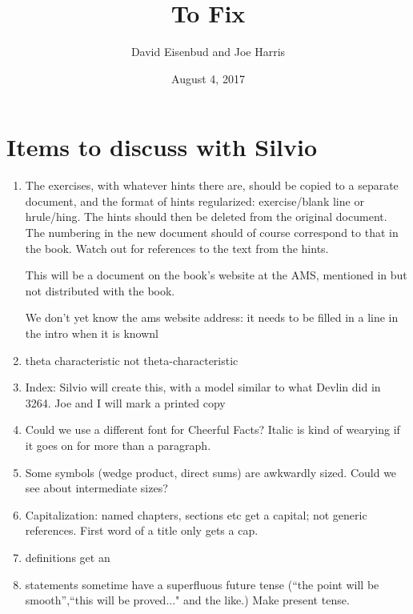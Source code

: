 \documentclass[12pt, leqno]{book}
\date{August 4, 2017}
\title{To Fix}
\author{David Eisenbud and Joe Harris }
\begin{document}
\maketitle

\setlength{\parskip}{5pt}

 
 \section{Items to discuss with Silvio}
 
 \begin{enumerate}
 
 \item The exercises, with whatever hints there are, should be copied to a separate document, and the format of hints regularized: 
 exercise/blank line or hrule/hing. The hints should then be deleted from the original document. The numbering in the new document should of course correspond to that in the book. Watch out for references to the text from the hints.
 
 This will be a document on the book's website at the AMS, 
 mentioned in but not distributed with the book.
 
 We don't yet know the ams website address: it needs to be filled in a line in the intro when it is knownl
   
\item theta characteristic not theta-characteristic 

 \item Index: Silvio will create this, with a model similar to what Devlin did in 3264. Joe and I will mark a printed copy
 
 \item Could we use a different font for Cheerful Facts? Italic is kind of wearying if it goes on for more than a paragraph.
 
 \item Some symbols (wedge product, direct sums) are awkwardly sized. Could we see about intermediate sizes?
 
 \item Capitalization: named chapters, sections etc get a capital; not generic references. First word of a title only gets a cap.
 
 \item definitions get an \emph{}
 
 \item statements sometime have a superfluous future tense (``the point will be smooth'',``this will be proved..." and the like.) Make present tense.
 

\end{enumerate}
\end{document}

